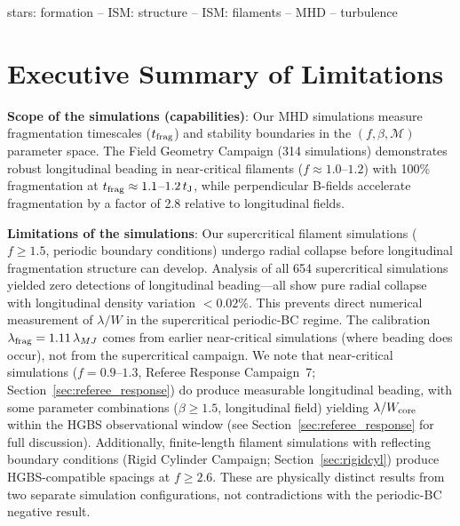 \documentclass[twoside,twocolumn]{mnras}
\begin{document}
\begin{keywords}
stars: formation -- ISM: structure -- ISM: filaments -- MHD -- turbulence
\end{keywords}

\section*{Executive Summary of Limitations}

\textbf{Scope of the simulations (capabilities)}: Our MHD simulations measure fragmentation timescales ($t_{\rm frag}$) and stability boundaries in the $(f, \beta, \mathcal{M})$ parameter space. The Field Geometry Campaign (314 simulations) demonstrates robust longitudinal beading in near-critical filaments ($f \approx 1.0$--$1.2$) with 100\% fragmentation at $t_{\rm frag} \approx 1.1$--$1.2\,t_{\rm J}$, while perpendicular B-fields accelerate fragmentation by a factor of 2.8 relative to longitudinal fields.

\textbf{Limitations of the simulations}: Our supercritical filament simulations ($f \geq 1.5$, periodic boundary conditions) undergo radial collapse before longitudinal fragmentation structure can develop. Analysis of all 654 supercritical simulations yielded zero detections of longitudinal beading---all show pure radial collapse with longitudinal density variation $<0.02\%$. This prevents direct numerical measurement of $\lambda/W$ in the supercritical periodic-BC regime. The calibration $\lambda_{\rm frag} = 1.11\,\lambda_{MJ}$ comes from earlier near-critical simulations (where beading does occur), not from the supercritical campaign. We note that near-critical simulations ($f = 0.9$--$1.3$, Referee Response Campaign~7; Section~\ref{sec:referee_response}) do produce measurable longitudinal beading, with some parameter combinations ($\beta \geq 1.5$, longitudinal field) yielding $\lambda/W_{\rm core}$ within the HGBS observational window (see Section~\ref{sec:referee_response} for full discussion). Additionally, finite-length filament simulations with reflecting boundary conditions (Rigid Cylinder Campaign; Section~\ref{sec:rigidcyl}) produce HGBS-compatible spacings at $f \geq 2.6$. These are physically distinct results from two separate simulation configurations, not contradictions with the periodic-BC negative result.
\end{document}
